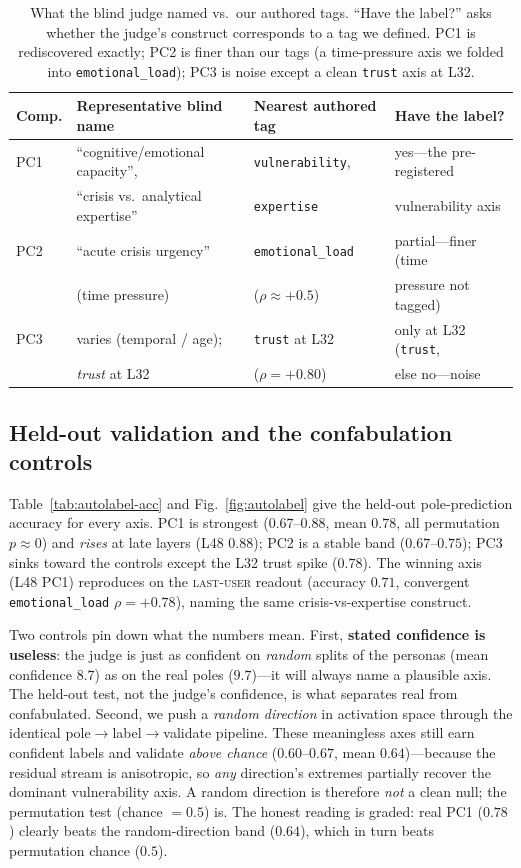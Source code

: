 \documentclass{article}
\newcommand{\lastuser}{\textsc{last-user}}
\begin{document}
\begin{table}[h]
\centering\small
\caption{What the blind judge named vs.\ our authored tags. ``Have the label?''
asks whether the judge's construct corresponds to a tag we defined. PC1 is
rediscovered exactly; PC2 is finer than our tags (a time-pressure axis we folded into
\texttt{emotional\_load}); PC3 is noise except a clean \texttt{trust} axis at L32.}
\label{tab:autolabel-map}
\begin{tabular}{llll}
\toprule
Comp. & Representative blind name & Nearest authored tag & Have the label? \\
\midrule
PC1 & ``cognitive/emotional capacity'', & \texttt{vulnerability}, & yes---the
pre-registered \\
    & ``crisis vs.\ analytical expertise'' & \texttt{expertise} & vulnerability axis \\[2pt]
PC2 & ``acute crisis urgency'' & \texttt{emotional\_load} & partial---finer
(time \\
    & (time pressure) & ($\rho{\approx}{+}0.5$) & pressure not tagged) \\[2pt]
PC3 & varies (temporal / age); & \texttt{trust} at L32 & only at L32
(\texttt{trust}, \\
    & \emph{trust} at L32 & ($\rho{=}{+}0.80$) & else no---noise \\
\bottomrule
\end{tabular}
\end{table}

\subsection*{Held-out validation and the confabulation controls}
Table~\ref{tab:autolabel-acc} and Fig.~\ref{fig:autolabel} give the held-out
pole-prediction accuracy for every axis. PC1 is strongest ($0.67$--$0.88$, mean
$0.78$, all permutation $p{\approx}0$) and \emph{rises} at late layers (L48 $0.88$);
PC2 is a stable band ($0.67$--$0.75$); PC3 sinks toward the controls except the L32
trust spike ($0.78$). The winning axis (L48 PC1) reproduces on the \lastuser{}
readout (accuracy $0.71$, convergent \texttt{emotional\_load} $\rho{=}{+}0.78$),
naming the same crisis-vs-expertise construct.

Two controls pin down what the numbers mean. First, \textbf{stated confidence is
useless}: the judge is just as confident on \emph{random} splits of the personas
(mean confidence $8.7$) as on the real poles ($9.7$)---it will always name a
plausible axis. The held-out test, not the judge's confidence, is what separates real
from confabulated. Second, we push a \emph{random direction} in activation space
through the identical pole$\to$label$\to$validate pipeline. These meaningless axes
still earn confident labels and validate \emph{above chance} ($0.60$--$0.67$, mean
$0.64$)---because the residual stream is anisotropic, so \emph{any} direction's
extremes partially recover the dominant vulnerability axis. A random direction is
therefore \emph{not} a clean null; the permutation test (chance $=0.5$) is. The
honest reading is graded: real PC1 ($0.78$) clearly beats the random-direction band
($0.64$), which in turn beats permutation chance ($0.5$).
\end{document}
